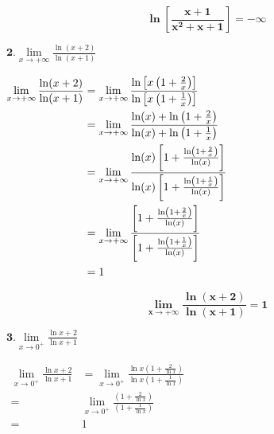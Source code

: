 \documentclass[12pt,a4paper]{article}
\begin{document}
\begin{resultbox}
    \[
        \mathbf{\ln\left[ \frac{x+1}{x^2 + x + 1}\right]=-\infty}
    \]
\end{resultbox}

\( \textbf{2.} \lim\limits_{x \to +\infty} \frac{\ln(x+2)}{\ln(x+1)} \)

\(
\begin{aligned}
    \lim\limits_{x \to +\infty} \frac{\ln(x+2)}{\ln(x+1)} & = \lim\limits_{x \to +\infty} \frac{\ln\left[x\left( 1+ \frac{2}{x}\right) \right]}{\ln\left[x\left( 1+ \frac{1}{x}\right) \right]}                                                      \\
                                                          & = \lim\limits_{x \to +\infty} \frac{ \ln(x) + \ln\left( 1+ \frac{2}{x}\right) }{ \ln(x) + \ln\left( 1+ \frac{1}{x}\right)}                                                               \\
                                                          & = \lim\limits_{x \to +\infty} \frac{ \ln(x) \left[ 1+ \frac{\ln\left( 1+ \frac{2}{x}\right)}{\ln(x)} \right] }{ \ln(x) \left[ 1+ \frac{\ln\left( 1+ \frac{1}{x}\right)}{\ln(x)} \right]} \\
                                                          & = \lim\limits_{x \to +\infty} \frac{ \left[ 1+ \frac{\ln\left( 1+ \frac{2}{x}\right)}{\ln(x)} \right] }{ \left[1+ \frac{\ln\left( 1+ \frac{1}{x}\right)}{\ln(x)} \right]}                \\
                                                          & = 1                                                                                                                                                                                      \\
\end{aligned}\\
\)

\begin{resultbox}
    \[
        \mathbf{\lim\limits_{x \to +\infty} \frac{\ln(x+2)}{\ln(x+1)}=1}
    \]
\end{resultbox}

\( \textbf{3.} \lim\limits_{x \to 0^+} \frac{\ln x+2}{\ln x+1} \)

\(
\begin{aligned}
    \lim\limits_{x \to 0^+} \frac{\ln x+2}{\ln x+1} & =\lim\limits_{x \to 0^+} \frac{\ln x\left(1+\frac{2}{\ln x}\right)}{\ln x\left(1+\frac{1}{\ln x}\right)} \\
    =                                               & \lim\limits_{x \to 0^+} \frac{\left(1+\frac{2}{\ln x}\right)}{\left(1+\frac{1}{\ln x}\right)}            \\
    =                                               & 1
\end{aligned}
\)
\end{document}
